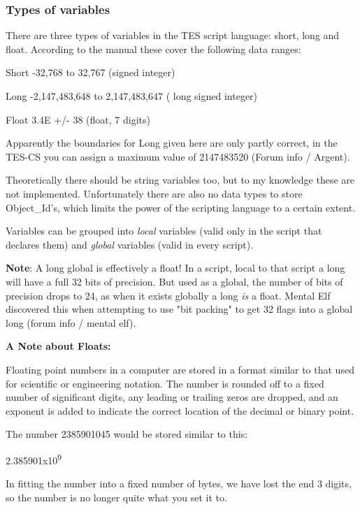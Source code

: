 \documentclass[
]{article}
\begin{document}
\hypertarget{types-of-variables}{%
\subsubsection{Types of variables}\label{types-of-variables}}

There are three types of variables in the TES script language: short,
long and float. According to the manual these cover the following data
ranges:

Short -32,768 to 32,767 (signed integer)

Long -2,147,483,648 to 2,147,483,647 ( long signed integer)

Float 3.4E +/- 38 (float, 7 digits)

Apparently the boundaries for Long given here are only partly correct,
in the TES-CS you can assign a maximum value of 2147483520 (Forum info /
Argent).

Theoretically there should be string variables too, but to my knowledge
these are not implemented. Unfortunately there are also no data types to
store Object\_Id's, which limits the power of the scripting language to
a certain extent.

Variables can be grouped into \emph{local} variables (valid only in the
script that declares them) and \emph{global} variables (valid in every
script).

\textbf{Note}: A long global is effectively a float! In a script, local
to that script a long will have a full 32 bits of precision. But used as
a global, the number of bits of precision drops to 24, as when it exists
globally a long \emph{is} a float. Mental Elf discovered this when
attempting to use "bit packing" to get 32 flags into a global long
(forum info / mental elf).

\textbf{A Note about Floats:}

Floating point numbers in a computer are stored in a format similar to
that used for scientific or engineering notation. The number is rounded
off to a fixed number of significant digits, any leading or trailing
zeros are dropped, and an exponent is added to indicate the correct
location of the decimal or binary point.

The number 2385901045 would be stored similar to this:

2.385901x10\textsuperscript{9}

In fitting the number into a fixed number of bytes, we have lost the end
3 digits, so the number is no longer quite what you set it to.
\end{document}
